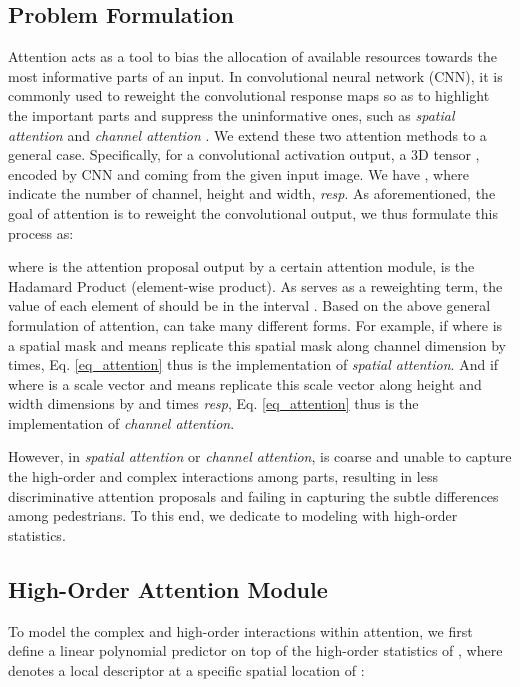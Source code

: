 \documentclass[10pt,twocolumn,letterpaper]{article}
\begin{document}
\subsection{Problem Formulation}\label{sec_attention}
Attention acts as a tool to bias the allocation of available resources towards the most informative parts of an input. In convolutional neural network (CNN), it is commonly used to reweight the convolutional response maps so as to highlight the important parts and suppress the uninformative ones, such as \emph{spatial attention} \cite{li2018diversity,li2018harmonious} and \emph{channel attention} \cite{hu2018squeeze,li2018harmonious}. We extend these two attention methods to a general case. Specifically, for a convolutional activation output, a 3D tensor , encoded by CNN and coming from the given input image. We have , where  indicate the number of channel, height and width, \emph{resp}. As aforementioned, the goal of attention is to reweight the convolutional output, we thus formulate this process as:
\vspace{-0.6em}

where  is the attention proposal output by a certain attention module,  is the Hadamard Product (element-wise product). As  serves as a reweighting term, the value of each element of  should be in the interval . Based on the above general formulation of attention,  can take many different forms. For example, if  where  is a spatial mask and  means replicate this spatial mask  along channel dimension by  times, Eq. \ref{eq_attention} thus is the implementation of \emph{spatial attention}. And if  where  is a scale vector and  means replicate this scale vector along height and width dimensions by  and  times \emph{resp}, Eq. \ref{eq_attention} thus is the implementation of \emph{channel attention}.

However, in \emph{spatial attention} or \emph{channel attention},  is coarse and unable to capture the high-order and complex interactions among parts, resulting in less discriminative attention proposals and failing in capturing the subtle differences among pedestrians. To this end, we dedicate to modeling  with high-order statistics.
\subsection{High-Order Attention Module}\label{sec_hoa}
To model the complex and high-order interactions within attention, we first define a linear polynomial predictor on top of the high-order statistics of , where  denotes a local descriptor at a specific spatial location of  :
\vspace{-0.5em}
\end{document}
